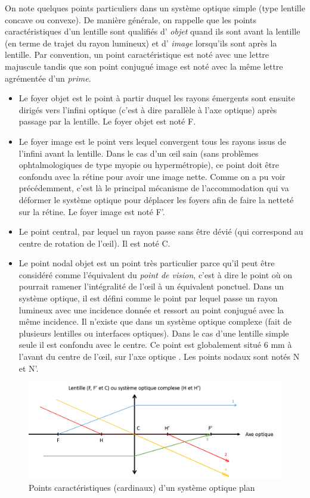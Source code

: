 	\par On note quelques points particuliers dans un système optique simple (type lentille concave ou convexe). De manière générale, on rappelle que les points caractéristiques d'un lentille sont qualifiés d' \textit{objet} quand ils sont avant la lentille (en terme de trajet du rayon lumineux) et d' \textit{image} lorsqu'ils sont après la lentille. Par convention, un point caractéristique est noté avec une lettre majuscule tandis que son point conjugué image est noté avec la même lettre agrémentée d'un \textit{prime}.
	\begin{itemize}
		\item Le foyer objet est le point à partir duquel les rayons émergents sont ensuite dirigés vers l'infini optique (c'est à dire parallèle à l'axe optique) après passage par la lentille. Le foyer objet est noté F.
		\item Le foyer image est le point vers lequel convergent tous les rayons issus de l'infini avant la lentille. Dans le cas d'un œil sain (sans problèmes ophtalmologiques de type myopie ou hypermétropie), ce point doit être confondu avec la rétine pour avoir une image nette. Comme on a pu voir précédemment, c'est là le principal mécanisme de l'accommodation qui va déformer le système optique pour déplacer les foyers afin de faire la netteté sur la rétine. Le foyer image est noté F'.
		\item Le point central, par lequel un rayon passe sans être dévié (qui correspond au centre de rotation de l'œil). Il est noté C.
		\item Le point nodal objet est un point très particulier parce qu'il peut être considéré comme l'équivalent du \textit{point de vision}, c'est à dire le point où on pourrait ramener l'intégralité de l'œil à un équivalent ponctuel. Dans un système optique, il est défini comme le point par lequel passe un rayon lumineux avec une incidence donnée et ressort au point conjugué avec la même incidence. Il n'existe que dans un système optique complexe (fait de plusieurs lentilles ou interfaces optiques). Dans le cas d'une lentille simple seule il est confondu avec le centre. Ce point est globalement situé 6 mm à l'avant du centre de l'œil, sur l'axe optique \citep{gross_human_2008,ogle_optics:_1968}. Les points nodaux sont notés N et N'.
	\end{itemize}
	
	\begin{figure}
		\centering
		\includegraphics[scale=.5]{Figures/PointsSystemeOptique}
		\caption{Points caractéristiques (cardinaux) d'un système optique plan}
		\label{fig:points_cardinaux_systeme_optique}
	\end{figure}
	
